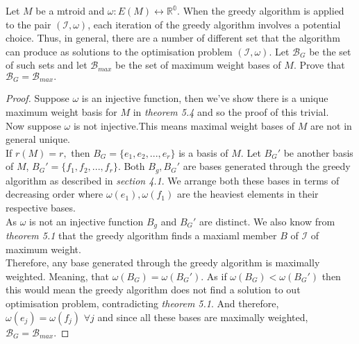 \documentclass[../main.tex]{subfiles}
\begin{document}
\begin{thm}
Let $M$ be a mtroid and $\omega: E(M) \longleftrightarrow \mathbb{R^0}.$ When the greedy algorithm is applied to the pair $(\mathcal{I},\omega)$, each iteration of the greedy algorithm involves a potential choice. Thus, in general, there are a number of different set that the algorithm can produce as solutions to the optimisation problem $(\mathcal{I}, \omega).$ Let $\mathcal{B}_G$ be the set of such sets and let $\mathcal{B}_{max}$ be the set of maximum weight bases of $M.$ Prove that $\mathcal{B}_G = \mathcal{B}_{max}.$
\end{thm}
\begin{proof}
Suppose $\omega$ is an injective function, then we've show there is a unique maximum weight basis for $M$ in \textit{theorem 5.4} and so the proof of this trivial.\\
\indent Now suppose $\omega$ is not injective.This means maximal weight bases of $M$ are not in general unique.\\
If $r(M) = r,$ then $B_G = \{e_1,e_2, ..., e_r\}$ is a basis of $M.$ Let $B_G'$ be another basis of $M$, $B_G' = \{f_1, f_2, ..., f_r\}.$ Both $B_g, B_G'$ are bases generated through the greedy algorithm as described in \textit{section 4.1}.
We arrange both these bases in terms of decreasing order where $\omega(e_1), \omega(f_1)$ are the heaviest elements in their respective bases.\\
As $\omega$ is not an injective function $B_g$ and $B_G'$ are distinct. We also know from \textit{theorem 5.1} that the greedy algorithm finds a maxiaml member $B$ of $\mathcal{I}$ of maximum weight.\\
\indent Therefore, any base generated through the greedy algorithm is maximally weighted. Meaning, that $\omega(B_G) = \omega(B_G').$ As if $\omega(B_G) < \omega(B_G')$ then this would mean the greedy algorithm does not find a solution to out optimisation problem, contradicting \textit{theorem 5.1}.
And therefore, $\omega(e_j) = \omega(f_j)$ $ \forall j$ and since all these bases are maximally weighted, $\mathcal{B}_G = \mathcal{B}_{max}.$
\end{proof}
\end{document}
